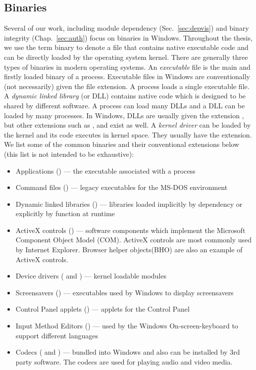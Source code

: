 \subsection{Binaries}
\label{sec:wi-binary}

Several of our work, including module dependency (Sec.~\ref{sec:depvis})
and binary integrity (Chap.~\ref{sec:auth}) focus on binaries in Windows.
Throughout the thesis, we use the term binary to denote a file that contains
native executable code and can be directly loaded by the operating system kernel.
There are generally three types of binaries in modern operating systems.
An {\em executable} file is the main and firstly loaded binary of a process.
Executable files in Windows are conventionally (not necessarily)
given the  file extension.
A process loads a single executable file.
A {\em dynamic linked library} (or DLL) contains native code which is designed
to be shared by different software.
A process can load many DLLs and a DLL can be loaded by many processes.
In Windows, DLLs are usually given the extension , but other extensions
such as ,  and  exist as well.
A {\em kernel driver} can be loaded by the kernel and its code executes in kernel
space.
They usually have the  extension.
We list some of the common binaries and their conventional extensions below
(this list is not intended to be exhaustive):

\begin{itemize}
\item Applications () ---
the executable associated with a process
\item Command files () ---
legacy executables for the MS-DOS environment
\item Dynamic linked libraries () ---
libraries loaded implicitly by dependency or
explicitly by  function at runtime
\item ActiveX controls () ---
software components which
implement the Microsoft Component Object Model (COM). 
ActiveX controls are most commonly used by Internet Explorer.
Browser helper objects(BHO) are also
an example of ActiveX controls.
\item Device drivers ( and ) ---
kernel loadable modules
\item Screensavers () ---
executables used by Windows to display screensavers
\item Control Panel applets () ---
applets for the Control Panel
\item Input Method Editors () ---
used by the Windows On-screen-keyboard to support different languages
\item Codecs ( and ) ---
bundled into Windows and also can be installed by 3rd party software.
The codecs are used for playing audio and video media.
\end{itemize}


